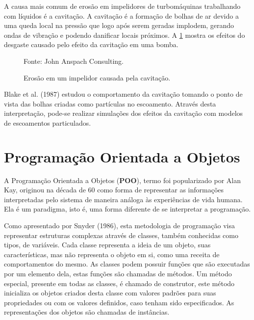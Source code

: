 A causa mais comum de erosão em impelidores de turbomáquinas trabalhando com líquidos é a cavitação.
A cavitação é a formação de bolhas de ar devido a uma queda local na pressão que logo após serem geradas implodem, gerando ondas de vibração e podendo danificar locais próximos.
A \ref{JAC-Pump} mostra os efeitos do desgaste causado pelo efeito da cavitação em uma bomba.
\begin{figure}[H]
    \centering
     {\raggedleft \scriptsize Fonte: John Anspach Consulting\cite{JAC}.}
    \caption{Erosão em um impelidor causada pela cavitação.}
    \label{JAC-Pump}
\end{figure}

Blake et al. (1987)\cite{Blake-1987} estudou o comportamento da cavitação tomando o ponto de vista das bolhas criadas como partículas no escoamento.
Através desta interpretação, pode-se realizar simulações dos efeitos da cavitação com modelos de escoamentos particulados.


\section{\textbf{Programação Orientada a Objetos}}
\label{sec_rev_POO}
A Programação Orientada a Objetos (\textbf{POO}), termo foi popularizado por Alan Kay, originou na década de 60 como forma de representar as informações interpretadas pelo sistema de maneira análoga às experiências de vida humana.
Ela é um paradigma, isto é, uma forma diferente de se interpretar a programação.

Como apresentado por Snyder (1986)\cite{Snyder-1986}, esta metodologia de programação visa representar estruturas complexas através de classes, também conhecidas como tipos, de variáveis.
Cada classe representa a ideia de um objeto, suas características, mas não representa o objeto em si, como uma receita de comportamentos do mesmo.
As classes podem possuir funções que são executadas por um elemento dela, estas funções são chamadas de métodos.
Um método especial, presente em todas as classes, é chamado de construtor, este método inicializa os objetos criados desta classe com valores padrões para suas propriedades ou com os valores definidos, caso tenham sido especificados.
As representações dos objetos são chamadas de instâncias.

